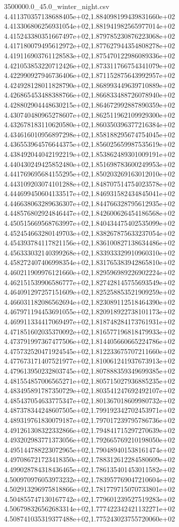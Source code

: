 \begin{filecontents*}{3500000.0_45.0_winter_night.csv}
4.411370357138688405e+02,1.884098199439831660e+02
4.413306806256931054e+02,1.881941982565977014e+02
4.415243380351667497e+02,1.879785230876223068e+02
4.417180079495612972e+02,1.877627944354808278e+02
4.419116903761128583e+02,1.875470122986089336e+02
4.421053853220712426e+02,1.873311766754341079e+02
4.422990927946736406e+02,1.871152875643992957e+02
4.424928128011828790e+02,1.868993449639710889e+02
4.426865453488388766e+02,1.866833488726078940e+02
4.428802904448630215e+02,1.864672992887890359e+02
4.430740480965278607e+02,1.862511962109929300e+02
4.432678183110620580e+02,1.860350396377216384e+02
4.434616010956897298e+02,1.858188295674754045e+02
4.436553964576644375e+02,1.856025659987535619e+02
4.438492044042192219e+02,1.853862489301009191e+02
4.440430249425852480e+02,1.851698783600249953e+02
4.441769695684155295e+02,1.850203269163012010e+02
4.443109203074101288e+02,1.848707514754023578e+02
4.444699450604133517e+02,1.846931582434845041e+02
4.446638063289636307e+02,1.844766328795612935e+02
4.448576802924846447e+02,1.842600626454186568e+02
4.450515669568763997e+02,1.840434475402535099e+02
4.452454663280149703e+02,1.838267875633237054e+02
4.454393784117821156e+02,1.836100827138634486e+02
4.456333032140399268e+02,1.833933329910960310e+02
4.458272407406998354e+02,1.831765383942865810e+02
4.460211909976121660e+02,1.829596989226902224e+02
4.462151539906586777e+02,1.827428145755693549e+02
4.464091297257151609e+02,1.825258853521909259e+02
4.466031182086562694e+02,1.823089112518464390e+02
4.467971194453691055e+02,1.820918922738101173e+02
4.469911334417069497e+02,1.818748284173761931e+02
4.471851602035370092e+02,1.816577196818479933e+02
4.473791997367477506e+02,1.814405660665224786e+02
4.475732520471924545e+02,1.812233675707211660e+02
4.477673171407521977e+02,1.810061241937673913e+02
4.479613950232803745e+02,1.807888359349699385e+02
4.481554857006565271e+02,1.805715027936885235e+02
4.483495891787350729e+02,1.803541247692492107e+02
4.485437054633775347e+02,1.801367018609980732e+02
4.487378344248607505e+02,1.799192342702453971e+02
4.489319761830079187e+02,1.797017239795786736e+02
4.491261308322332866e+02,1.794841715297270639e+02
4.493202983771373056e+02,1.792665769210198050e+02
4.495144788223072965e+02,1.790489401538161474e+02
4.497086721723418350e+02,1.788312612284580609e+02
4.499028784318436465e+02,1.786135401453011582e+02
4.500970976053973232e+02,1.783957769047210604e+02
4.502913296975818866e+02,1.781779715070733801e+02
4.504855747130167742e+02,1.779601239527519283e+02
4.506798326562683314e+02,1.777422342421132271e+02
4.508741035319377488e+02,1.775243023755720060e+02

\end{filecontents*}
